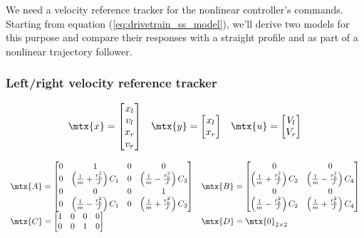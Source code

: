 We need a velocity \gls{reference} tracker for the nonlinear \gls{controller}'s
commands. Starting from equation (\ref{eq:drivetrain_ss_model}), we'll derive
two \glspl{model} for this purpose and compare their responses with a straight
profile and as part of a nonlinear trajectory follower.

\subsubsection{Left/right velocity reference tracker}

\begin{equation*}
  \begin{array}{ccc}
    \mtx{x} =
    \begin{bmatrix}
      x_l \\
      v_l \\
      x_r \\
      v_r
    \end{bmatrix} &
    \mtx{y} =
    \begin{bmatrix}
      x_l \\
      x_r
    \end{bmatrix} &
    \mtx{u} =
    \begin{bmatrix}
      V_l \\
      V_r
    \end{bmatrix}
  \end{array}
\end{equation*}

\begin{equation*}
  \begin{array}{ll}
    \mtx{A} =
    \begin{bmatrix}
      0 & 1 & 0 & 0 \\
      0 & \left(\frac{1}{m} + \frac{r_b^2}{J}\right) C_1 & 0 & \left(\frac{1}{m} - \frac{r_b^2}{J}\right) C_3 \\
      0 & 0 & 0 & 1 \\
      0 & \left(\frac{1}{m} - \frac{r_b^2}{J}\right) C_1 & 0 & \left(\frac{1}{m} + \frac{r_b^2}{J}\right) C_3
    \end{bmatrix} &
    \mtx{B} =
    \begin{bmatrix}
      0 & 0 \\
      \left(\frac{1}{m} + \frac{r_b^2}{J}\right) C_2 & \left(\frac{1}{m} - \frac{r_b^2}{J}\right) C_4 \\
      0 & 0 \\
      \left(\frac{1}{m} - \frac{r_b^2}{J}\right) C_2 & \left(\frac{1}{m} + \frac{r_b^2}{J}\right) C_4
    \end{bmatrix} \\
    \mtx{C} =
    \begin{bmatrix}
      1 & 0 & 0 & 0 \\
      0 & 0 & 1 & 0 \\
    \end{bmatrix} &
    \mtx{D} = \mtx{0}_{2 \times 2}
  \end{array}
\end{equation*}

